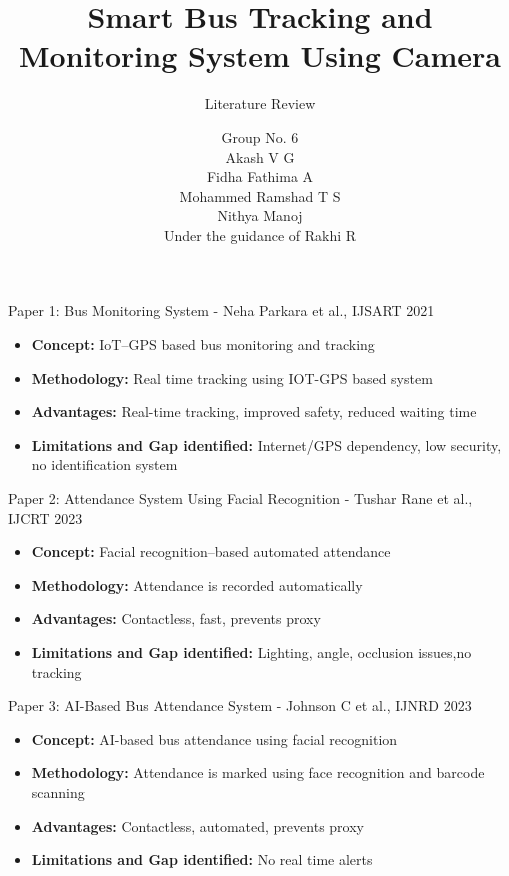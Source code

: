 \documentclass{beamer}
\title{Smart Bus Tracking and Monitoring System Using Camera}
\subtitle{Literature Review}
\author{
Group No. 6\\
Akash V G\\
Fidha Fathima A\\
Mohammed Ramshad T S\\
Nithya Manoj\\[5pt]
\small Under the guidance of Rakhi R
}
\date{}
\begin{document}
\begin{frame}
\titlepage
\end{frame}

\begin{frame}{Paper 1: Bus Monitoring System - Neha Parkara et al., IJSART 2021}

\begin{itemize}
\item \textbf{Concept:} IoT–GPS based bus monitoring and tracking
\item \textbf{Methodology:} Real time tracking using IOT-GPS based system
\item \textbf{Advantages:} Real-time tracking, improved safety, reduced waiting time
\item \textbf{Limitations and Gap identified:} Internet/GPS dependency, low security, no identification system

\end{itemize}
\end{frame}

\begin{frame}{Paper 2: Attendance System Using Facial Recognition - Tushar Rane et al., IJCRT 2023}

\begin{itemize}
\item \textbf{Concept:} Facial recognition–based automated attendance
\item \textbf{Methodology:} Attendance is recorded automatically
\item \textbf{Advantages:} Contactless, fast, prevents proxy
\item \textbf{Limitations and Gap identified:} Lighting, angle, occlusion issues,no tracking

\end{itemize}
\end{frame}

\begin{frame}{Paper 3: AI-Based Bus Attendance System - Johnson C et al., IJNRD 2023}

\begin{itemize}
\item \textbf{Concept:} AI-based bus attendance using facial recognition
\item \textbf{Methodology:} Attendance is marked using face recognition and barcode scanning
\item \textbf{Advantages:} Contactless, automated, prevents proxy
\item \textbf{Limitations and Gap identified:} No real time alerts

\end{itemize}
\end{frame}
\end{document}

